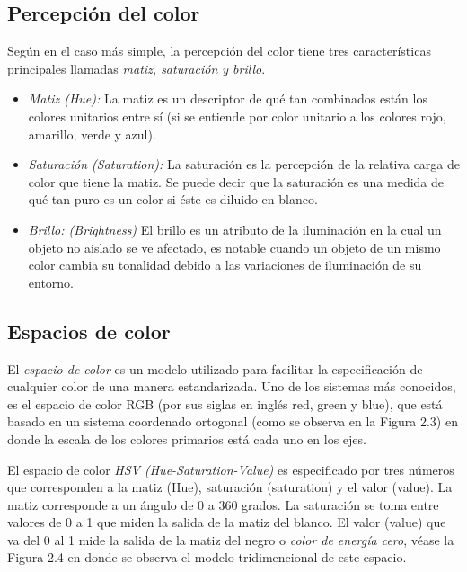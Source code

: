 		\subsection*{Percepción del color}
Según \cite{agoston2005computer} en el caso más simple, la percepción del color tiene tres características principales llamadas \textit{matiz, saturación y brillo}. 
\begin{itemize}
\item \textit{Matiz (Hue):} La matiz es un descriptor de qué tan combinados están los colores unitarios entre sí (si se entiende por color unitario a los colores rojo, amarillo, verde y azul).

\item \textit{Saturación (Saturation): } La saturación es la percepción de la relativa carga de color que tiene la matiz. Se puede decir que la saturación es una medida de qué tan puro es un color si éste es diluido en blanco.

\item \textit{Brillo: (Brightness)} El brillo es un atributo de la iluminación en la cual un objeto no aislado se ve afectado, es notable cuando un objeto de un  mismo color cambia su tonalidad debido a las variaciones de iluminación de su entorno.
\end{itemize}
		\subsection*{Espacios de color}
El \textit{espacio de color} es un modelo utilizado para facilitar la especificación de cualquier color de una manera estandarizada. Uno de los sistemas más conocidos, es el espacio de color RGB (por sus siglas en inglés red, green y blue), que está basado en un sistema coordenado ortogonal (como se observa en la Figura 2.3) en donde la escala de los colores primarios está cada uno en los ejes.

El espacio de color \textit{HSV (Hue-Saturation-Value)} es especificado por tres números que corresponden a la matiz (Hue), saturación (saturation) y el valor (value). La matiz corresponde a un ángulo de 0 a 360 grados. La saturación se toma entre valores de 0 a 1 que miden la salida de la matiz del blanco. El valor (value) que va del 0 al 1 mide la salida de la matiz del negro o \textit{color de energía cero}, véase la Figura 2.4 en donde se observa el modelo tridimencional de este espacio.

